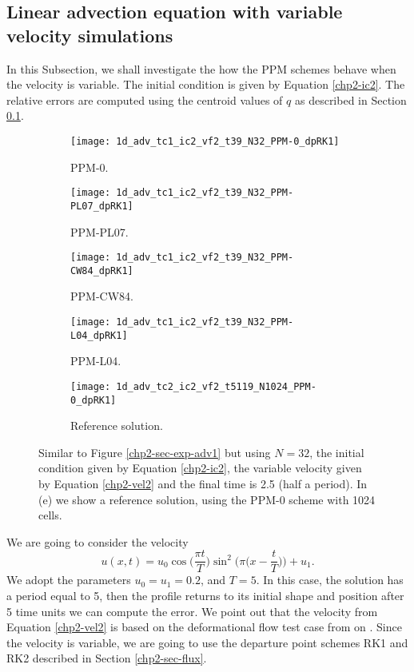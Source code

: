 \subsection{Linear advection equation with variable velocity simulations}
\label{chp2-sec-numerical-exp-2}
In this Subsection, we shall investigate the how the PPM schemes behave when the velocity
is variable. The initial condition is given by Equation \eqref{chp2-ic2}.
The relative errors are computed using the centroid values of $q$ as described in
Section \ref{chp2-sec-numerical-exp-2}. 
\begin{figure}[!htb]
  \centering
  \begin{subfigure}{0.49\textwidth}
    \centering
			\texttt{[image: 1d\_adv\_tc1\_ic2\_vf2\_t39\_N32\_PPM-0\_dpRK1]}
			\caption{PPM-0.\label{chp2-sec-exp-adv5-a}}
  \end{subfigure}
  \begin{subfigure}{0.49\textwidth}
    \centering
			\texttt{[image: 1d\_adv\_tc1\_ic2\_vf2\_t39\_N32\_PPM-PL07\_dpRK1]}
			\caption{PPM-PL07.\label{chp2-sec-exp-adv5-b}}
  \end{subfigure}

  \begin{subfigure}{0.49\textwidth}
    \centering
		\texttt{[image: 1d\_adv\_tc1\_ic2\_vf2\_t39\_N32\_PPM-CW84\_dpRK1]}
    \caption{PPM-CW84.\label{chp2-sec-exp-adv5-c}}
  \end{subfigure}
  \begin{subfigure}{0.49\textwidth}
    \centering
			\texttt{[image: 1d\_adv\_tc1\_ic2\_vf2\_t39\_N32\_PPM-L04\_dpRK1]}
      \caption{PPM-L04.\label{chp2-sec-exp-adv5-d}}
  \end{subfigure} 

  \begin{subfigure}{0.49\textwidth}
    \centering
			\texttt{[image: 1d\_adv\_tc2\_ic2\_vf2\_t5119\_N1024\_PPM-0\_dpRK1]}
      \caption{Reference solution.\label{chp2-sec-exp-adv5-e}}
  \end{subfigure} 
	\caption{ Similar to Figure \ref{chp2-sec-exp-adv1} but using $N=32$, 
	the initial condition given by Equation \eqref{chp2-ic2}, the variable velocity given by Equation
	\eqref{chp2-vel2} and the final time is 2.5 (half a period). In (e) we show a reference solution, using the PPM-0 scheme with 
	1024 cells. \label{chp2-sec-exp-adv5}}
\end{figure}

\newpage
We are going to consider the velocity
\begin{equation}
	\label{chp2-vel2}
	u(x,t) = u_0\cos{\bigg(\frac{\pi t}{T}\bigg)}\sin^2\bigg(\pi \bigg(x-\frac{t}{T}\bigg)\bigg) + u_1.
\end{equation}
We adopt the parameters $u_0 = u_1 = 0.2$,  and $T = 5$.
In this case, the solution has a period equal to 5, then the profile returns to its
initial shape and position after 5 time units we can compute the error.
We point out that the velocity from Equation \eqref{chp2-vel2} is based on the deformational
flow test case from on \citet{nair:2010}. Since the velocity is variable, we are going to
use the departure point schemes RK1 and RK2 described in Section \ref{chp2-sec-flux}.

